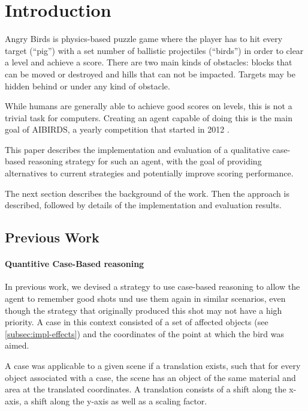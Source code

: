 \section{Introduction}\label{sec:intro}

Angry Birds is physics-based puzzle game where the player has to hit every target (``pig'') with a set number of ballistic projectiles (``birds'') in order to clear a level and achieve a score.
There are two main kinds of obstacles: blocks that can be moved or destroyed and hills that can not be impacted. Targets may be hidden behind or under any kind of obstacle.

While humans are generally able to achieve good scores on levels, this is not a trivial task for computers.
Creating an agent capable of doing this is the main goal of AIBIRDS, a yearly competition that started in 2012 \cite{Renz2015AIBIRDSTA}.

This paper describes the implementation and evaluation of a qualitative case-based reasoning strategy for such an agent, with the goal of providing alternatives to current strategies and potentially improve scoring performance.

The next section describes the background of the work. Then the approach is described, followed by details of the implementation and evaluation results.

\subsection{Previous Work}
\paragraph{Quantitive Case-Based reasoning}\label{par:quantititve-cbr}
In previous work, we devised a strategy to use case-based reasoning to allow the agent to remember good shots und use them again in similar scenarios, even though the strategy that originally produced this shot may not have a high priority.
A case in this context consisted of a set of affected objects (see \ref{subsec:impl-effects}) and the coordinates of the point at which the bird was aimed.

A case was applicable to a given scene if a translation exists, such that for every object associated with a case, the scene has an object of the same material and area at the translated coordinates. A translation consists of a shift along the x-axis, a shift along the y-axis as well as a scaling factor.

